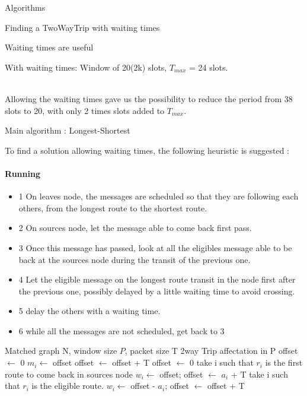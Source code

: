 \documentclass[a4paper,10pt]{report}
\begin{document}
\begin{chapter}{Algorithms}
\begin{section}{Finding a TwoWayTrip with waiting times}
\begin{subsection}{Waiting times are useful}
{{{
  }
  
    With waiting times: Window of 20(2k) slots, $T_{max}$ = 24 slots.

  }}\\
  
  Allowing the waiting times gave us the possibility to reduce the period from 38 slots to 20, with only 2 times slots added to $T_{max}$.
\end{subsection}
\begin{subsection}{Main algorithm : Longest-Shortest}
 

To find a solution allowing waiting times, the following heuristic is suggested :

\paragraph{Running}
\begin{itemize}
 \item 1 On leaves node, the messages are scheduled so that they are following each others, from the longest route to the shortest route.
 \item 2 On sources node, let the message able to come back first pass.
 \item 3 Once this message has passed, look at all the eligibles message able to be back at the sources node during the transit of the previous one.
 \item 4 Let the eligible message on the longest route transit in the node first after the previous one, possibly delayed by a little waiting time to avoid crossing.
 \item 5 delay the others with a waiting time.
 \item 6 while all the messages are not scheduled, get back to 3
\end{itemize}

\begin{algorithm}[H]
\caption{Longest shortest with waiting times}
\begin{algorithmic}
\REQUIRE Matched graph N, window size $P$, packet size T
\ENSURE 2way Trip affectation in P
\STATE offset $\leftarrow$ 0
\STATE  $m_i \leftarrow$ offset
\STATE offset $\leftarrow$ offset + T
\ENDFOR
\STATE offset $\leftarrow$ 0
\STATE take i such that $r_i$ is the first route to come back in sources node
\STATE $w_i \leftarrow $ offset;
\STATE offset $\leftarrow$ $a_i$ + T
\STATE take i such that $r_i$ is the eligible route.
\STATE $w_i \leftarrow $ offset - $a_i$;
\STATE offset $\leftarrow$ offset + T


\end{algorithmic}
\end{algorithm}
\end{subsection}
\end{section}
\end{chapter}
\end{document}
